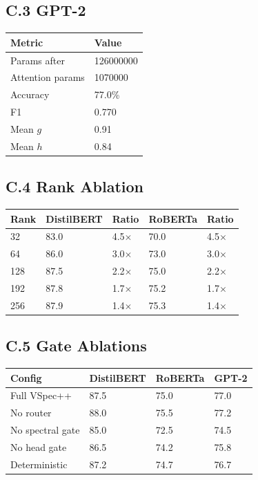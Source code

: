 \subsection{C.3 GPT-2}

\begin{table}[H]
\centering
\small
\begin{tabular}{ll}
\toprule
\textbf{Metric} & \textbf{Value} \\
\midrule
Params after & 126000000 \\
Attention params & 1070000 \\
Accuracy & 77.0\% \\
F1 & 0.770 \\
Mean $g$ & 0.91 \\
Mean $h$ & 0.84 \\
\bottomrule
\end{tabular}
\end{table}

\subsection{C.4 Rank Ablation}

\begin{table}[H]
\centering
\small
\begin{tabular}{lllll}
\toprule
\textbf{Rank} & \textbf{DistilBERT} & \textbf{Ratio} & \textbf{RoBERTa} & \textbf{Ratio} \\
\midrule
32 & 83.0 & 4.5$\times$ & 70.0 & 4.5$\times$ \\
64 & 86.0 & 3.0$\times$ & 73.0 & 3.0$\times$ \\
128 & 87.5 & 2.2$\times$ & 75.0 & 2.2$\times$ \\
192 & 87.8 & 1.7$\times$ & 75.2 & 1.7$\times$ \\
256 & 87.9 & 1.4$\times$ & 75.3 & 1.4$\times$ \\
\bottomrule
\end{tabular}
\end{table}

\subsection{C.5 Gate Ablations}

\begin{table}[H]
\centering
\small
\begin{tabular}{llll}
\toprule
\textbf{Config} & \textbf{DistilBERT} & \textbf{RoBERTa} & \textbf{GPT-2} \\
\midrule
Full VSpec++ & 87.5 & 75.0 & 77.0 \\
No router & 88.0 & 75.5 & 77.2 \\
No spectral gate & 85.0 & 72.5 & 74.5 \\
No head gate & 86.5 & 74.2 & 75.8 \\
Deterministic & 87.2 & 74.7 & 76.7 \\
\bottomrule
\end{tabular}
\end{table}

